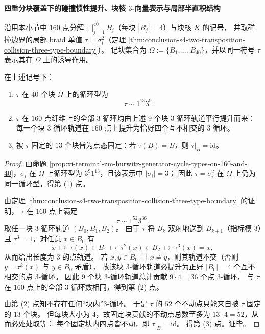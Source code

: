 \paragraph{四重分块覆盖下的碰撞惯性提升、块核 \texorpdfstring{$3$}{3}-向量表示与局部半直积结构}
沿用本小节中 \(160\) 点分解 \(\bigsqcup_{j=1}^{40}B_j\)（每块 \(|B_j|=4\)）与块核 \(K\) 的记号，
并取碰撞边界的局部 braid 单值 \(\tau=\sigma_i^2\)（定理 \ref{thm:conclusion-s4-two-transposition-collision-three-type-boundary}）。
记块集合为 \(\Omega:=\{B_1,\dots,B_{40}\}\)，并以同一符号 \(\tau\) 表示其在 \(\Omega\) 上的诱导作用。

\begin{conclusion}[块纯提升与点态固定性]\label{con:conclusion-s4-collision-block-pure-lift-pointwise-fixedness}
在上述记号下：
\begin{enumerate}
  \item \(\tau\) 在 \(40\) 个块 \(\Omega\) 上的循环型为
  \[
  \tau\sim 1^{13}3^{9}.
  \]
  \item \(\tau\) 在 \(160\) 点纤维上的全部 \(3\)-循环均由上述 \(9\) 个块 \(3\)-循环轨道平行提升而来：每一个块 \(3\)-循环轨道在 \(160\) 点上提升为恰好四个互不相交的 \(3\)-循环。
  \item 被 \(\tau\) 固定的 \(13\) 个块皆为点态固定：若 \(\tau(B)=B\)，则 \(\tau|_{B}=\mathrm{id}\)。
\end{enumerate}
\end{conclusion}
\begin{proof}
由命题 \ref{prop:xi-terminal-zm-hurwitz-generator-cycle-types-on-160-and-40}，\(\sigma_i\) 在 \(\Omega\) 上循环型为 \(3^{9}1^{13}\)，且该表示中 \(|\sigma_i|=3\)；
因此 \(\tau=\sigma_i^2\) 在 \(\Omega\) 上仍为同一循环型，得第 (1) 点。
\par
由定理 \ref{thm:conclusion-s4-two-transposition-collision-three-type-boundary} 的证明，
\(\tau\) 在 \(160\) 点上满足
\[
\tau\sim 1^{52}3^{36}.
\]
取任一块 \(3\)-循环轨道 \((B_0,B_1,B_2)\)。
由于 \(\tau\) 将 \(B_k\) 双射地送到 \(B_{k+1}\)（指标模 \(3\)）且 \(\tau^3=1\)，对任意 \(x\in B_0\) 有
\[
x\ \mapsto\ \tau(x)\in B_1\ \mapsto\ \tau^2(x)\in B_2\ \mapsto\ \tau^3(x)=x,
\]
从而给出长度为 \(3\) 的点轨道。
若 \(x,y\in B_0\) 且 \(x\neq y\)，则其轨道不交（否则 \(y=\tau^k(x)\) 与 \(y\in B_0\) 矛盾），
故该块 \(3\)-循环轨道必提升为正好 \(|B_0|=4\) 个互不相交的点 \(3\)-循环。
因此 \(9\) 个块 \(3\)-循环轨道总计贡献 \(9\cdot 4=36\) 个点 \(3\)-循环，
与 \(\tau\) 在 \(160\) 点上的全部 \(3\)-循环数相同，得到第 (2) 点。
\par
由第 (2) 点知不存在任何“块内”\(3\)-循环。
于是 \(\tau\) 的 \(52\) 个不动点只能来自被 \(\tau\) 固定的 \(13\) 个块。
但每块大小为 \(4\)，故固定块贡献的不动点总数至多为 \(13\cdot 4=52\)，从而必处处取等：
每个固定块内四点皆不动，即 \(\tau|_{B}=\mathrm{id}\)。
得第 (3) 点。证毕。
\end{proof}


